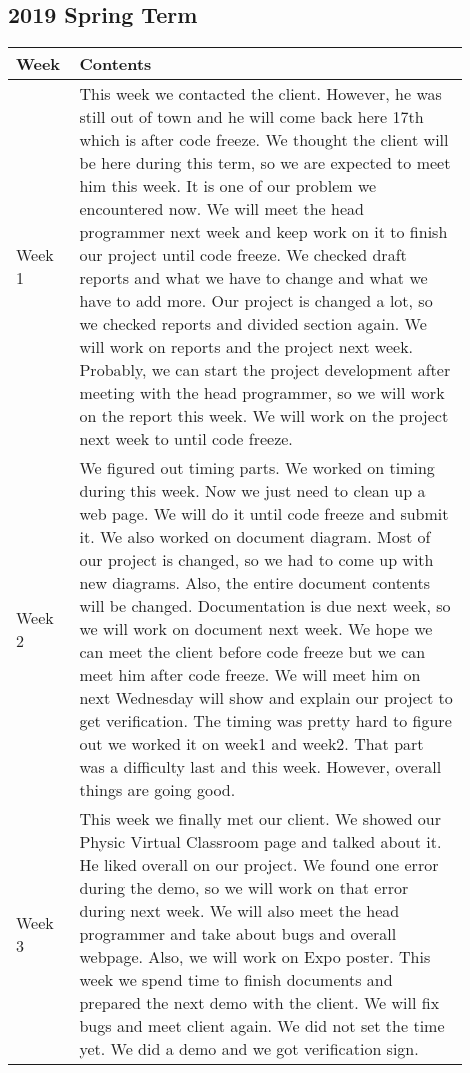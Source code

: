 \documentclass[10pt]{article}
\begin{document}
    \subsection{2019 Spring Term}
        \begin{center}
        \begin{tabular}{ | p{0.1\linewidth} | p{0.8\linewidth} | } \hline
            Week & Contents  \\ \hline  
            Week 1 & This week we contacted the client. However, he was still out of town and he will come back here 17th which is after code freeze. We thought the client will be here during this term, so we are expected to meet him this week. It is one of our problem we encountered now. We will meet the head programmer next week and keep work on it to finish our project until code freeze. We checked draft reports and what we have to change and what we have to add more. Our project is changed a lot, so we checked reports and divided section again. We will work on reports and the project next week. Probably, we can start the project development after meeting with the head programmer, so we will work on the report this week. We will work on the project next week to until code freeze.     \\ \hline
            Week 2 & We figured out timing parts. We worked on timing during this week. Now we just need to clean up a web page. We will do it until code freeze and submit it. We also worked on document diagram. Most of our project is changed, so we had to come up with new diagrams. Also, the entire document contents will be changed. Documentation is due next week, so we will work on document next week.  We hope we can meet the client before code freeze but we can meet him after code freeze. We will meet him on next Wednesday will show and explain our project to get verification. The timing was pretty hard to figure out we worked it on week1 and week2. That part was a difficulty last and this week. However, overall things are going good. \\ \hline
            Week 3 & This week we finally met our client. We showed our Physic Virtual Classroom page and talked about it. He liked overall on our project. We found one error during the demo, so we will work on that error during next week. We will also meet the head programmer and take about bugs and overall webpage. Also, we will work on Expo poster. This week we spend time to finish documents and prepared the next demo with the client. We will fix bugs and meet client again. We did not set the time yet. We did a demo and we got verification sign.    \\ \hline

\end{tabular}
\end{center}
\end{document}
